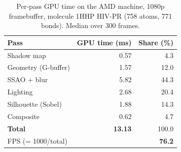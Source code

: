 \begin{table}[H]
    \centering
    \small
    \begin{tabular}{lrr}
        \toprule
        Pass & GPU time (ms) & Share (\%) \\
        \midrule
        Shadow map & 0.57 & 4.3 \\
        Geometry (G-buffer) & 1.57 & 12.0 \\
        SSAO + blur & 5.82 & 44.3 \\
        Lighting & 2.68 & 20.4 \\
        Silhouette (Sobel) & 1.88 & 14.3 \\
        Composite & 0.62 & 4.7 \\
        \midrule
        \textbf{Total} & \textbf{13.13} & 100.0 \\
        FPS (= 1000/total) & \multicolumn{2}{r}{\textbf{76.2}} \\
        \bottomrule
    \end{tabular}
    \caption{Per-pass GPU time on the AMD machine, 1080p framebuffer, molecule 1HHP HIV-PR (758 atoms, 771 bonds). Median over 300 frames.}
    \label{tab:perpass_amd}
\end{table}
